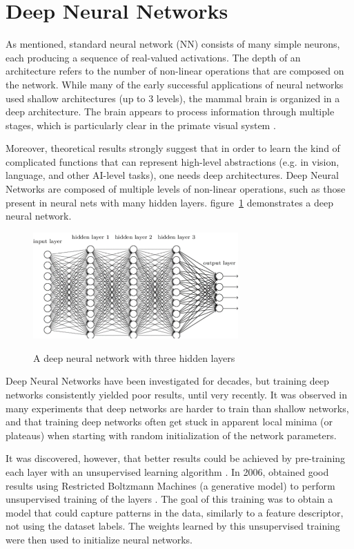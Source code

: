 \section{Deep Neural Networks}
\label{sec:deepcnn}
As mentioned, standard neural network (NN) consists of many simple neurons, each producing a sequence of real-valued activations\cite{deepnn}. The depth of an architecture refers to the number of non-linear operations that are composed on the network. While many of the early successful applications of neural networks used shallow architectures (up to 3 levels), the mammal brain is organized in a deep architecture. The brain appears to process information through multiple stages, which is particularly clear in the primate visual system \cite{bengio2009learning}.

Moreover, theoretical results strongly suggest that in order to learn the kind of complicated functions that can represent high-level abstractions (e.g. in vision, language, and other AI-level tasks), one needs deep architectures. Deep Neural Networks are composed of multiple levels of non-linear operations, such as those present in neural nets with many hidden layers\cite{bengio2009learning}. figure~\ref{fig:deepl} demonstrates a deep neural network. 

\begin{figure}[H]
	\centering
	{\includegraphics[width=0.7\textwidth]{images/deepnn}}
	\caption{A deep neural network with three hidden layers}
	\label{fig:deepl}
\end{figure}

Deep Neural Networks have been investigated for decades, but training deep networks consistently yielded poor results, until very recently. It was observed in many experiments that deep networks are harder to train than shallow networks, and that training deep networks often get stuck in apparent local minima (or plateaus) when starting with random initialization of the network parameters.

It was discovered, however, that better results could be achieved by pre-training each layer with an unsupervised learning algorithm \cite{hinton2006fast}. In 2006, \citeauthor{hinton2006fast} obtained good results using Restricted Boltzmann Machines (a generative model) to perform unsupervised training of the layers \cite{hinton2006fast}. The goal of this training was to obtain a model that could capture patterns in the data, similarly to a feature descriptor, not using the dataset labels. The weights learned by this unsupervised training were then used to initialize neural networks. 

